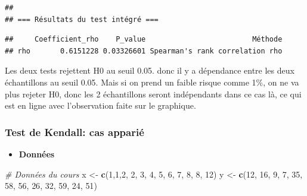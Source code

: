 \documentclass[
  12pt,
]{article}
\newenvironment{Shaded}{\begin{snugshade}}{\end{snugshade}}
\newcommand{\AttributeTok}[1]{\textcolor[rgb]{0.13,0.29,0.53}{#1}}
\newcommand{\CommentTok}[1]{\textcolor[rgb]{0.56,0.35,0.01}{\textit{#1}}}
\newcommand{\DecValTok}[1]{\textcolor[rgb]{0.00,0.00,0.81}{#1}}
\newcommand{\FunctionTok}[1]{\textcolor[rgb]{0.13,0.29,0.53}{\textbf{#1}}}
\newcommand{\NormalTok}[1]{#1}
\newcommand{\OtherTok}[1]{\textcolor[rgb]{0.56,0.35,0.01}{#1}}
\newcommand{\SpecialCharTok}[1]{\textcolor[rgb]{0.81,0.36,0.00}{\textbf{#1}}}
\providecommand{\tightlist}{%
  \setlength{\itemsep}{0pt}\setlength{\parskip}{0pt}}
\begin{document}
\begin{verbatim}
## 
## === Résultats du test intégré ===
\end{verbatim}

\begin{Shaded}
\end{Shaded}

\begin{verbatim}
##     Coefficient_rho    P_value                         Méthode
## rho       0.6151228 0.03326601 Spearman's rank correlation rho
\end{verbatim}

Les deux tests rejettent H0 au seuil 0.05. donc il y a dépendance entre
les deux échantillons au seuil 0.05. Mais si on prend un faible risque
comme 1\%, on ne va plus rejeter H0, donc les 2 échantillons seront
indépendants dans ce cas là, ce qui est en ligne avec l'observation
faite sur le graphique.

\subsubsection{Test de Kendall: cas
apparié}\label{test-de-kendall-cas-appariuxe9}

\begin{itemize}
\tightlist
\item
  \textbf{Données}
\end{itemize}

\begin{Shaded}
\begin{Highlighting}[]
\CommentTok{\# Données du cours}
\NormalTok{x }\OtherTok{\textless{}{-}} \FunctionTok{c}\NormalTok{(}\DecValTok{1}\NormalTok{,}\DecValTok{1}\NormalTok{,}\DecValTok{2}\NormalTok{, }\DecValTok{2}\NormalTok{, }\DecValTok{3}\NormalTok{, }\DecValTok{4}\NormalTok{, }\DecValTok{5}\NormalTok{, }\DecValTok{6}\NormalTok{, }\DecValTok{7}\NormalTok{, }\DecValTok{8}\NormalTok{, }\DecValTok{8}\NormalTok{, }\DecValTok{12}\NormalTok{)}
\NormalTok{y }\OtherTok{\textless{}{-}} \FunctionTok{c}\NormalTok{(}\DecValTok{12}\NormalTok{, }\DecValTok{16}\NormalTok{, }\DecValTok{9}\NormalTok{, }\DecValTok{7}\NormalTok{, }\DecValTok{35}\NormalTok{, }\DecValTok{58}\NormalTok{, }\DecValTok{56}\NormalTok{, }\DecValTok{26}\NormalTok{, }\DecValTok{32}\NormalTok{, }\DecValTok{59}\NormalTok{, }\DecValTok{24}\NormalTok{, }\DecValTok{51}\NormalTok{)}
\end{Highlighting}
\end{Shaded}
\end{document}
